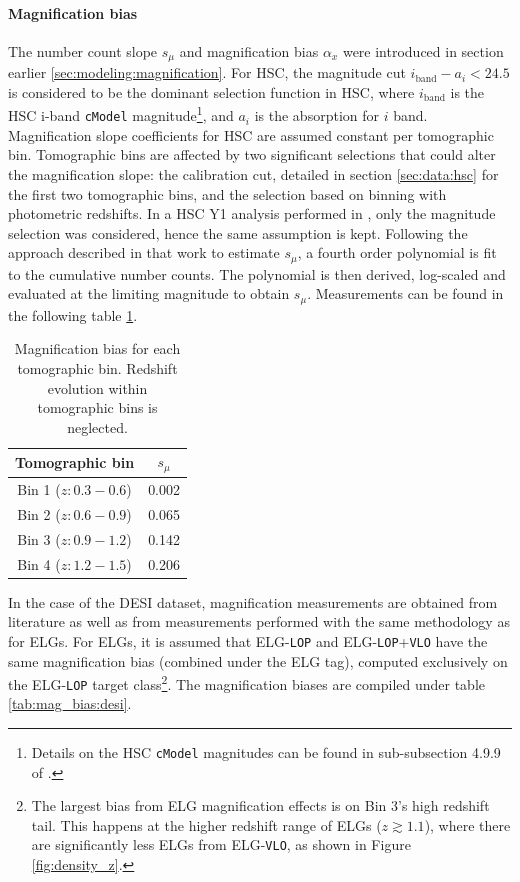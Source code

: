 \paragraph{Magnification bias}
\label{sec:modeling:magnification:bias:mag}
The number count slope $s_\mu$ and magnification bias $\alpha_x$ were introduced in section earlier \ref{sec:modeling:magnification}. For HSC, the magnitude cut $i_{\mathrm{band}}-a_i<24.5$ is considered to be the dominant selection function in HSC, where $i_{\mathrm{band}}$ is the HSC i-band \texttt{cModel} magnitude\footnote{Details on the HSC \texttt{cModel} magnitudes can be found in sub-subsection 4.9.9 of \cite{BoschHSCpipelineY1}.}, and $a_i$ is the absorption for $i$ band. Magnification slope coefficients for HSC are assumed constant per tomographic bin. Tomographic bins are affected by two significant selections that could alter the magnification slope: the calibration cut, detailed in section \ref{sec:data:hsc} for the first two tomographic bins, and the selection based on binning with photometric redshifts. In a HSC Y1 analysis performed in \cite{Nicola2020TomoclusteringHSCY1}, only the magnitude selection was considered, hence the same assumption is kept. Following the approach described in that work to estimate $s_\mu$,  a fourth order polynomial is fit to the cumulative number counts. The polynomial is then derived, log-scaled and evaluated at the limiting magnitude to obtain $s_\mu$. Measurements can be found in the following table \ref{tab:mag_bias:hsc}.

\begin{table}[h]
\centering
\caption{Magnification bias for each tomographic bin. Redshift evolution within tomographic bins is neglected.}
\begin{tabular}{c|c}
\hline
\textbf{Tomographic bin} & $s_\mu$ \\
\hline
Bin 1 ($z:0.3-0.6$) & 0.002 \\
Bin 2 ($z:0.6-0.9$) & 0.065\\
Bin 3 ($z:0.9-1.2$) & 0.142 \\
Bin 4 ($z:1.2-1.5$) & 0.206 \\
\end{tabular}
\label{tab:mag_bias:hsc}
\end{table}

In the case of the DESI dataset, magnification measurements are obtained from literature \cite{Sailer2025EvolutionStructureMagnificationBiasBGS, DESI.LRGCross.Magnifcation.Zhou2023, debelsunce2025QSOmagCMBLensing} as well as from measurements performed with the same methodology as \cite{heydenreich2025lensingbordersmeasurementsgalaxygalaxy} for ELGs. For ELGs, it is assumed that ELG-\texttt{LOP} and ELG-\texttt{LOP}+\texttt{VLO} have the same magnification bias (combined under the ELG tag), computed exclusively on the ELG-\texttt{LOP} target class\footnote{The largest bias from ELG magnification effects is on Bin 3's high redshift tail. This happens at the higher redshift range of ELGs ($z\gtrsim1.1$), where there are significantly less ELGs from ELG-\texttt{VLO}, as shown in Figure \ref{fig:density_z}.}. The magnification biases are compiled under table \ref{tab:mag_bias:desi}.

